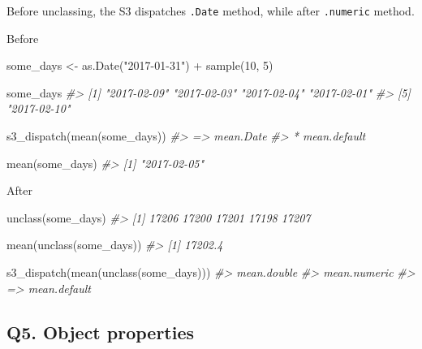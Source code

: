 \documentclass[
]{book}
\newenvironment{Shaded}{\begin{snugshade}}{\end{snugshade}}
\newcommand{\CommentTok}[1]{\textcolor[rgb]{0.56,0.35,0.01}{\textit{#1}}}
\newcommand{\DecValTok}[1]{\textcolor[rgb]{0.00,0.00,0.81}{#1}}
\newcommand{\FunctionTok}[1]{\textcolor[rgb]{0.00,0.00,0.00}{#1}}
\newcommand{\NormalTok}[1]{#1}
\newcommand{\OtherTok}[1]{\textcolor[rgb]{0.56,0.35,0.01}{#1}}
\newcommand{\SpecialCharTok}[1]{\textcolor[rgb]{0.00,0.00,0.00}{#1}}
\newcommand{\StringTok}[1]{\textcolor[rgb]{0.31,0.60,0.02}{#1}}
\begin{document}
Before unclassing, the S3 dispatches \texttt{.Date} method, while after \texttt{.numeric} method.

Before

\begin{Shaded}
\begin{Highlighting}[]
\NormalTok{some\_days }\OtherTok{\textless{}{-}} \FunctionTok{as.Date}\NormalTok{(}\StringTok{"2017{-}01{-}31"}\NormalTok{) }\SpecialCharTok{+} \FunctionTok{sample}\NormalTok{(}\DecValTok{10}\NormalTok{, }\DecValTok{5}\NormalTok{)}

\NormalTok{some\_days}
\CommentTok{\#\textgreater{} [1] "2017{-}02{-}09" "2017{-}02{-}03" "2017{-}02{-}04" "2017{-}02{-}01"}
\CommentTok{\#\textgreater{} [5] "2017{-}02{-}10"}

\FunctionTok{s3\_dispatch}\NormalTok{(}\FunctionTok{mean}\NormalTok{(some\_days))}
\CommentTok{\#\textgreater{} =\textgreater{} mean.Date}
\CommentTok{\#\textgreater{}  * mean.default}

\FunctionTok{mean}\NormalTok{(some\_days)}
\CommentTok{\#\textgreater{} [1] "2017{-}02{-}05"}
\end{Highlighting}
\end{Shaded}

After

\begin{Shaded}
\begin{Highlighting}[]
\FunctionTok{unclass}\NormalTok{(some\_days)}
\CommentTok{\#\textgreater{} [1] 17206 17200 17201 17198 17207}

\FunctionTok{mean}\NormalTok{(}\FunctionTok{unclass}\NormalTok{(some\_days))}
\CommentTok{\#\textgreater{} [1] 17202.4}

\FunctionTok{s3\_dispatch}\NormalTok{(}\FunctionTok{mean}\NormalTok{(}\FunctionTok{unclass}\NormalTok{(some\_days)))}
\CommentTok{\#\textgreater{}    mean.double}
\CommentTok{\#\textgreater{}    mean.numeric}
\CommentTok{\#\textgreater{} =\textgreater{} mean.default}
\end{Highlighting}
\end{Shaded}

\hypertarget{q5.-object-properties}{%
\subsection*{Q5. Object properties}\label{q5.-object-properties}}
\end{document}
